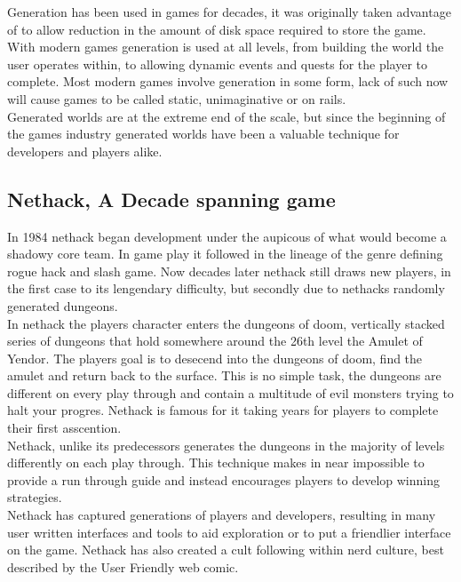 Generation has been used in games for decades, it was originally taken advantage
of to allow reduction in the amount of disk space required to store the game.
With modern games generation is used at all levels, from building the world the
user operates within, to allowing dynamic events and quests for the player to
complete. Most modern games involve generation in some form, lack of such now 
will cause games to be called static, unimaginative or on rails.\\

Generated worlds are at the extreme end of the scale, but since the beginning of
the games industry generated worlds have been a valuable technique for developers
and players alike.\\

\subsection{Nethack, A Decade spanning game}
In 1984 nethack began development under the aupicous of what would become a 
shadowy core team. In game play it followed in the lineage of the genre defining
rogue hack and slash game. Now decades later nethack still draws new players,
in the first case to its lengendary difficulty, but secondly due to nethacks 
randomly generated dungeons.\\ 

In nethack the players character enters the dungeons of doom, vertically stacked
series of dungeons that hold somewhere around the 26th level the Amulet of 
Yendor. The players goal is to desecend into the dungeons of doom, find the
amulet and return back to the surface. This is no simple task, the dungeons are 
different on every play through and contain a multitude of evil monsters trying
to halt your progres. Nethack is famous for it taking years for players to 
complete their first asscention.\\

Nethack, unlike its predecessors generates the dungeons in the majority of levels
differently on each play through. This technique makes in near impossible to 
provide a run through guide and instead encourages players to develop winning
strategies.\\


Nethack has captured generations of players and developers, resulting in many 
user written interfaces and tools to aid exploration or to put a friendlier 
interface on the game. Nethack has also created a cult following within nerd 
culture, best described by the User Friendly web comic.\\

